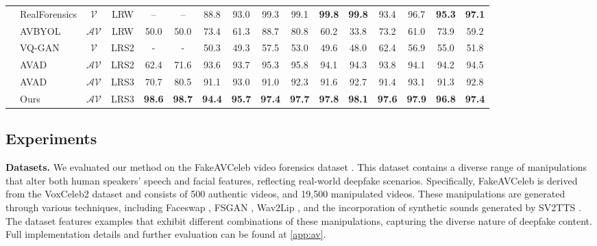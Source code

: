 \documentclass{article} \usepackage{iclr2024_conference,times}
\begin{document}
\begin{table}[t]
{\begin{tabular}{clcccccccccccccc}
& RealForensics   &  $\mathcal{V}$  & LRW   &   --   &  --   &    88.8      &     93.0&      99.3       &   99.1    &           \textbf{99.8}     &       \textbf{99.8}      &   93.4  &     96.7  & \textbf{95.3} & \textbf{97.1}       \\
\cmidrule(lr){1-16}
\parbox[t]{4mm}{} & AVBYOL & $\mathcal{A} \mathcal{V}$ & LRW & 50.0 & 50.0 & 73.4 & 61.3 & 88.7 & 80.8 & 60.2 & 33.8 & 73.2 & 61.0 & 73.9 & 59.2 \\
& VQ-GAN & $\mathcal{V}$ & LRS2 & - & - & 50.3 & 49.3 & 57.5 & 53.0 & 49.6 & 48.0 & 62.4 & 56.9 & 55.0 & 51.8 \\
& AVAD & $\mathcal{A} \mathcal{V}$ & LRS2 & 62.4 & 71.6  & 93.6 & 93.7 & 95.3 & 95.8 & 94.1 & 94.3 & 93.8 & 94.1 & 94.2 & 94.5  \\
& AVAD & $\mathcal{A} \mathcal{V}$ & LRS3 & 70.7 & 80.5  & 91.1 & 93.0 & 91.0 & 92.3 & 91.6 & 92.7 & 91.4 & 93.1 & 91.3 & 92.8 \\
& Ours & $\mathcal{A} \mathcal{V}$ & LRS3 & \textbf{98.6} & \textbf{98.7} & \textbf{94.4} & \textbf{95.7} & \textbf{97.4} & \textbf{97.7} & \textbf{97.8} & \textbf{98.1} & \textbf{97.6} & \textbf{97.9} & \textbf{96.8} & \textbf{97.4}\\
\bottomrule
\end{tabular}
}
\vspace{-0.25em}
\end{table}

\subsection{Experiments}
\textbf{Datasets.} 
We evaluated our method on the FakeAVCeleb video forensics dataset \citep{fakeavceleb}. This dataset contains a diverse range of manipulations that alter both human speakers' speech and facial features, reflecting real-world deepfake scenarios. Specifically, FakeAVCeleb is derived from the VoxCeleb2 dataset and consists of 500 authentic videos, and 19,500 manipulated videos. These manipulations are generated through various techniques, including Faceswap \citep{faceswap}, FSGAN \citep{faceswap4}, Wav2Lip \citep{wav2lip}, and the incorporation of synthetic sounds generated by SV2TTS \citep{sv2tts}. The dataset features examples that exhibit different combinations of these manipulations, capturing the diverse nature of deepfake content. Full implementation details and further evaluation can be found at \cref{app:av}.
\end{document}
